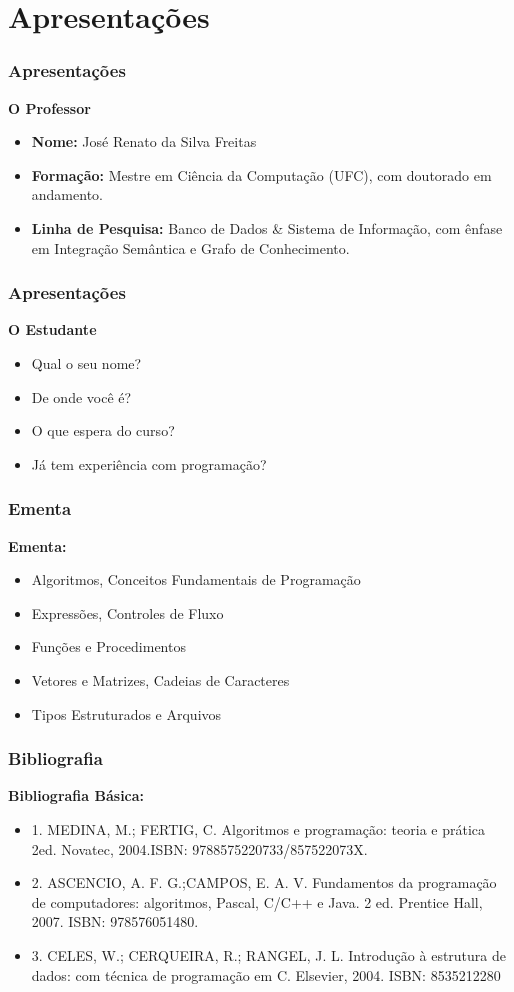 \section{Apresentações}

\begin{frame}
	\frametitle{Apresentações}

	\textbf{O Professor}
	\begin{itemize}
		\item \textbf{Nome:} José Renato da Silva Freitas
		\item \textbf{Formação:} Mestre em Ciência da Computação (UFC), com doutorado em andamento.
		\item \textbf{Linha de Pesquisa:} Banco de Dados \& Sistema de Informação, com ênfase em Integração Semântica e Grafo de Conhecimento.
	\end{itemize}
\end{frame}


\begin{frame}
	\frametitle{Apresentações}

	\textbf{O Estudante}
	\begin{itemize}
		\item Qual o seu nome?
		\item De onde você é?
		\item O que espera do curso?
		\item Já tem experiência com programação?
	\end{itemize}
\end{frame}






\begin{frame}
	\frametitle{Ementa}

	\textbf{Ementa:}
	\begin{itemize}
		\item Algoritmos, Conceitos Fundamentais de Programação
		\item Expressões, Controles de Fluxo
		\item Funções e Procedimentos
		\item Vetores e Matrizes, Cadeias de Caracteres
		\item Tipos Estruturados e Arquivos
	\end{itemize}
\end{frame}


\begin{frame}
	\frametitle{Bibliografia}

	\textbf{Bibliografia Básica:}
	\begin{itemize}
		\item 1. MEDINA, M.; FERTIG, C. Algoritmos e programação: teoria e prática 2ed. Novatec, 2004.ISBN:
		9788575220733/857522073X.
		\item 2. ASCENCIO, A. F. G.;CAMPOS, E. A. V. Fundamentos da programação de computadores: algoritmos,
		Pascal, C/C++ e Java. 2 ed. Prentice Hall, 2007. ISBN: 978576051480.
		\item 3. CELES, W.; CERQUEIRA, R.; RANGEL, J. L. Introdução à estrutura de dados: com técnica de
		programação em C. Elsevier, 2004. ISBN: 8535212280
	\end{itemize}
\end{frame}


